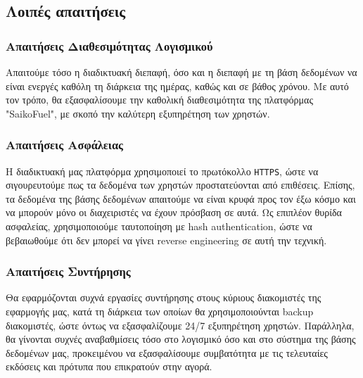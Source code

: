 
\subsection{Λοιπές απαιτήσεις}

\subsubsection{Απαιτήσεις Διαθεσιμότητας Λογισμικού}
Απαιτούμε τόσο η διαδικτυακή διεπαφή, όσο και η διεπαφή με τη βάση δεδομένων να είναι ενεργές καθόλη τη διάρκεια της ημέρας, καθώς και σε βάθος χρόνου. Με αυτό τον τρόπο, θα εξασφαλίσουμε την καθολική διαθεσιμότητα της πλατφόρμας "SaikoFuel", με σκοπό την καλύτερη εξυπηρέτηση των χρηστών.

\subsubsection{Απαιτήσεις Ασφάλειας}
Η διαδικτυακή μας πλατφόρμα χρησιμοποιεί το πρωτόκολλο \texttt{HTTPS}, ώστε να σιγουρευτούμε πως τα δεδομένα των χρηστών προστατεύονται από επιθέσεις. Επίσης, τα δεδομένα της βάσης δεδομένων απαιτούμε να είναι κρυφά προς τον έξω κόσμο και να μπορούν μόνο οι διαχειριστές να έχουν πρόσβαση σε αυτά. Ως επιπλέον θυρίδα ασφαλείας, χρησιμοποιούμε ταυτοποίηση με hash authentication, ώστε να βεβαιωθούμε ότι δεν μπορεί να γίνει reverse engineering σε αυτή την τεχνική.

\subsubsection{Απαιτήσεις Συντήρησης}
Θα εφαρμόζονται συχνά εργασίες συντήρησης στους κύριους διακομιστές της εφαρμογής μας, κατά τη διάρκεια των οποίων θα χρησιμοποιούνται backup διακομιστές, ώστε όντως να εξασφαλίζουμε 24/7 εξυπηρέτηση χρηστών. Παράλληλα, θα γίνονται συχνές αναβαθμίσεις τόσο στο λογισμικό όσο και στο σύστημα της βάσης δεδομένων μας, προκειμένου να εξασφαλίσουμε συμβατότητα με τις τελευταίες εκδόσεις και πρότυπα που επικρατούν στην αγορά.
